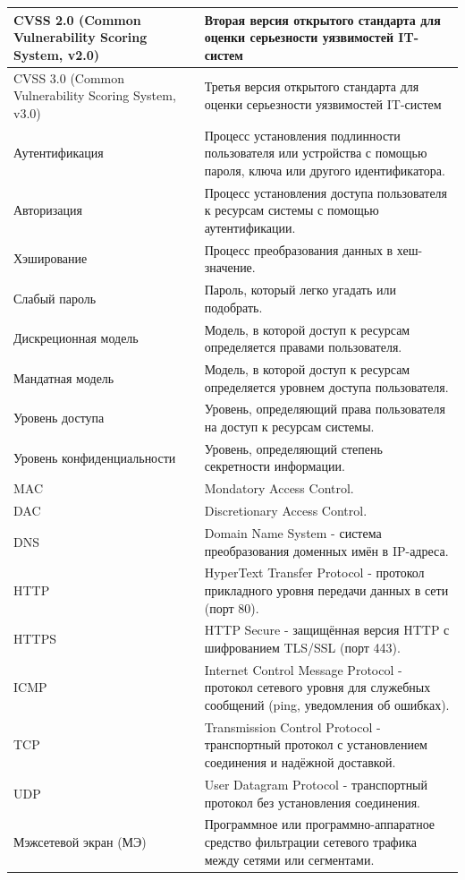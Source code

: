 \documentclass[areasetadvanced]{scrartcl}
\begin{document}
\begin{center}
\begin{longtable}{>{\raggedright\arraybackslash}p{3.5cm}>{\raggedright\arraybackslash}p{9.5cm}}
\hline
CVSS 2.0 (Common Vulnerability Scoring System, v2.0) & Вторая версия открытого стандарта для оценки серьезности уязвимостей IT-систем \\
\hline
CVSS 3.0 (Common Vulnerability Scoring System, v3.0) & Третья версия открытого стандарта для оценки серьезности уязвимостей IT-систем \\
\hline
Аутентификация & Процесс установления подлинности пользователя или устройства с помощью пароля, ключа или другого идентификатора. \\
\hline
Авторизация & Процесс установления доступа пользователя к ресурсам системы с помощью аутентификации. \\
\hline
Хэширование & Процесс преобразования данных в хеш-значение. \\
\hline
Слабый пароль & Пароль, который легко угадать или подобрать. \\
\hline
Дискреционная модель & Модель, в которой доступ к ресурсам определяется правами пользователя. \\
\hline
Мандатная модель & Модель, в которой доступ к ресурсам определяется уровнем доступа пользователя. \\
\hline
Уровень доступа & Уровень, определяющий права пользователя на доступ к ресурсам системы. \\
\hline
Уровень конфиденциальности & Уровень, определяющий степень секретности информации. \\
\hline
MAC & Mondatory Access Control. \\
\hline
DAC & Discretionary Access Control. \\
\hline 
DNS & Domain Name System - система преобразования доменных имён в IP-адреса. \\
\hline 
HTTP & HyperText Transfer Protocol - протокол прикладного уровня передачи данных в сети (порт 80). \\
\hline 
HTTPS & HTTP Secure - защищённая версия HTTP с шифрованием TLS/SSL (порт 443). \\
\hline 
ICMP & Internet Control Message Protocol - протокол сетевого уровня для служебных сообщений (ping, уведомления об ошибках). \\
\hline 
TCP & Transmission Control Protocol - транспортный протокол с установлением соединения и надёжной доставкой. \\
\hline 
UDP & User Datagram Protocol - транспортный протокол без установления соединения. \\
\hline 
Мэжсетевой экран (МЭ) & Программное или программно-аппаратное средство фильтрации сетевого трафика между сетями или сегментами. \\

\end{longtable}
\end{center}
\end{document}
